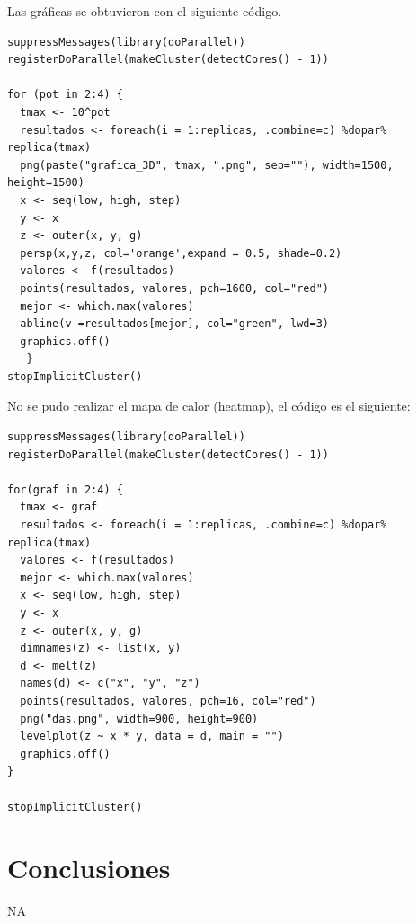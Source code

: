 \documentclass{article}
\begin{document}
Las gráficas se obtuvieron con el siguiente código.
\begin{lstlisting}[frame=single]
suppressMessages(library(doParallel))
registerDoParallel(makeCluster(detectCores() - 1))

for (pot in 2:4) {
  tmax <- 10^pot
  resultados <- foreach(i = 1:replicas, .combine=c) %dopar% replica(tmax)
  png(paste("grafica_3D", tmax, ".png", sep=""), width=1500, height=1500)
  x <- seq(low, high, step)
  y <- x
  z <- outer(x, y, g)
  persp(x,y,z, col='orange',expand = 0.5, shade=0.2)
  valores <- f(resultados)
  points(resultados, valores, pch=1600, col="red")
  mejor <- which.max(valores)
  abline(v =resultados[mejor], col="green", lwd=3)
  graphics.off()
   }
stopImplicitCluster()

\end{lstlisting}


No se pudo realizar el mapa de calor (heatmap), el código es el siguiente:
\begin{lstlisting}[frame=single]
suppressMessages(library(doParallel))
registerDoParallel(makeCluster(detectCores() - 1))

for(graf in 2:4) {
  tmax <- graf
  resultados <- foreach(i = 1:replicas, .combine=c) %dopar% replica(tmax)
  valores <- f(resultados)
  mejor <- which.max(valores)
  x <- seq(low, high, step)
  y <- x
  z <- outer(x, y, g)
  dimnames(z) <- list(x, y)
  d <- melt(z)
  names(d) <- c("x", "y", "z")
  points(resultados, valores, pch=16, col="red")
  png("das.png", width=900, height=900)
  levelplot(z ~ x * y, data = d, main = "")
  graphics.off()
}

stopImplicitCluster()
\end{lstlisting}

\section{Conclusiones}
NA



\end{document}
